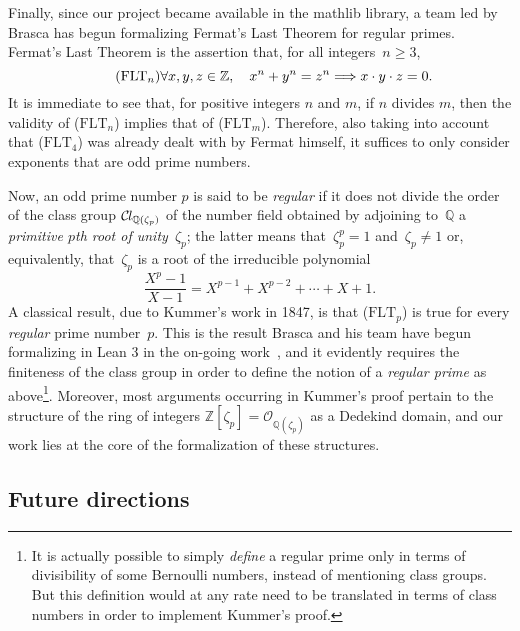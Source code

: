 \documentclass[sn-mathphys]{sn-jnl}%
\newcommand*{\OK}[1][K]{\mathcal{O}_{#1}}
\newcommand*{\Cl}{\mathcal{C}\kern-.075em l}
\newcommand*{\refFLT}[1]{($\mathrm{FLT}_{#1}$)}
\newcommand{\mathlib}{\textsf{mathlib}\xspace}
\newcommand{\QQ}{\mathbb{Q}}
\renewcommand{\Z}{\mathbb{Z}}
\begin{document}
Finally, since our project became available in the \mathlib library, a team led by Brasca has begun formalizing Fermat's Last Theorem for regular primes. Fermat's Last Theorem is the assertion that, for all integers~$n\geq 3$,
\begin{equation}\tag*{\refFLT{n}}
\forall x,y,z \in \Z, \quad x^n+y^n=z^n\Longrightarrow x\cdot y \cdot z =0.
\end{equation}
It is immediate to see that, for positive integers $n$ and $m$, if $n$ divides $m$, then the validity of \refFLT{n} implies that of \refFLT{m}.
Therefore, also taking into account that \refFLT{4} was already dealt with by Fermat himself, it suffices to only consider exponents that are odd prime numbers.

Now, an odd prime number $p$ is said to be \emph{regular} if it does not divide the order of the class group $\Cl_{\QQ(\zeta_p)}$ of the number field obtained by adjoining to~$\QQ$ a \emph{primitive $p$th root of unity}~$\zeta_p$; the latter means that~$\zeta_p^p=1$ and~$\zeta_p\neq 1$ or, equivalently, that~$\zeta_p$ is a root of the irreducible polynomial
\[
\frac{X^p-1}{X-1}=X^{p-1}+X^{p-2}+\cdots +X+1.
\]
A classical result, due to Kummer's work in 1847, is that \refFLT{p} is true for every \emph{regular} prime number~$p$. This is the result Brasca and his team have begun formalizing in Lean 3 in the on-going work~\cite{Bra21}, and it evidently requires the finiteness of the class group in order to define the notion of a \emph{regular prime} as above\footnote{It is actually possible to simply \emph{define} a regular prime only in terms of divisibility of some Bernoulli numbers, instead of mentioning class groups. But this definition would at any rate need to be translated in terms of class numbers in order to implement Kummer's proof.}. Moreover, most arguments occurring in Kummer's proof pertain to the structure of the ring of integers $\Z[\zeta_p]=\OK[\QQ(\zeta_p)]$ as a Dedekind domain, and our work lies at the core of the formalization of these structures.


\subsection{Future directions}\label{sec:future_directions}
\end{document}
